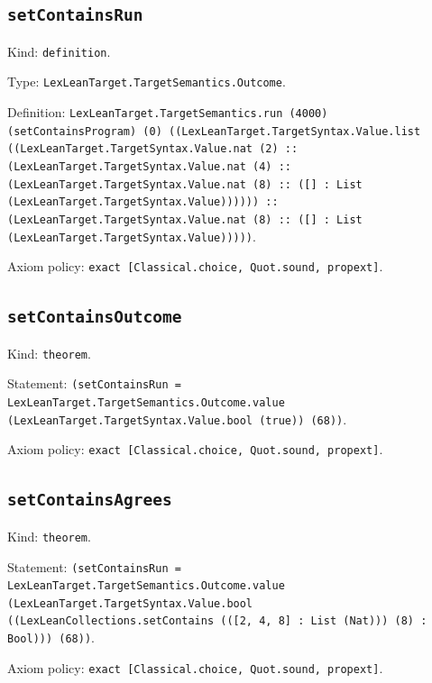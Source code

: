 \documentclass[11pt]{article}
\begin{document}
\subsection*{\texttt{setContainsRun}}
\noindent Kind: \texttt{definition}.\par
\noindent Type: \texttt{LexLeanTarget.TargetSemantics.Outcome}.\par
\noindent Definition: \texttt{LexLeanTarget.TargetSemantics.run (4000) (setContainsProgram) (0) ((LexLeanTarget.TargetSyntax.Value.list ((LexLeanTarget.TargetSyntax.Value.nat (2) :: (LexLeanTarget.TargetSyntax.Value.nat (4) :: (LexLeanTarget.TargetSyntax.Value.nat (8) :: ([] : List (LexLeanTarget.TargetSyntax.Value)))))) :: (LexLeanTarget.TargetSyntax.Value.nat (8) :: ([] : List (LexLeanTarget.TargetSyntax.Value)))))}.\par
\noindent Axiom policy: \texttt{exact [Classical.choice, Quot.sound, propext]}.\par
\subsection*{\texttt{setContainsOutcome}}
\noindent Kind: \texttt{theorem}.\par
\noindent Statement: \texttt{(setContainsRun = LexLeanTarget.TargetSemantics.Outcome.value (LexLeanTarget.TargetSyntax.Value.bool (true)) (68))}.\par
\noindent Axiom policy: \texttt{exact [Classical.choice, Quot.sound, propext]}.\par
\subsection*{\texttt{setContainsAgrees}}
\noindent Kind: \texttt{theorem}.\par
\noindent Statement: \texttt{(setContainsRun = LexLeanTarget.TargetSemantics.Outcome.value (LexLeanTarget.TargetSyntax.Value.bool ((LexLeanCollections.setContains (([2, 4, 8] : List (Nat))) (8) : Bool))) (68))}.\par
\noindent Axiom policy: \texttt{exact [Classical.choice, Quot.sound, propext]}.\par
\end{document}
